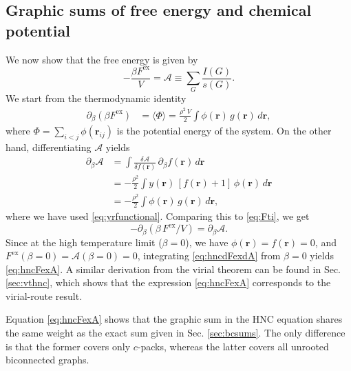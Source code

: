 \documentclass[preprint]{revtex4-1}
\newcommand{\vct}[1]{\mathbf{#1}}
\providecommand{\vr}{} %
\renewcommand{\vr}{\vct{r}}
\newcommand{\supex}[1]{ { { #1 }^{ \mathrm{ex} } } }
\newcommand{\Fex}{\supex{F}}
\newcommand{\A}{\mathcal{A}}
\begin{document}
\subsection{\label{sec:hncFex}Graphic sums of free energy and chemical potential}


We now show that the free energy is given by\cite{morita1958, *morita1959, *morita1960}
\begin{equation}
  -\frac{ \beta \Fex }{V}
=
  \A \equiv \sum_G \frac{ I(G) }{ s(G) }.
\label{eq:hncFexA}
\end{equation}
%
We start from the thermodynamic identity
\begin{align}
  \partial_\beta (\beta \Fex)
&=
 \langle \Phi \rangle
=
\frac{\rho^2 \, V}{2} \int
  \phi(\vr) \, g(\vr) \, d\vr,
  \label{eq:Fti}
\end{align}
where $\Phi = \sum_{i < j} \phi(\vr_{ij})$
is the potential energy of the system.
%
On the other hand, differentiating $\A$ yields
\begin{align*}
  \partial_\beta \A
&=
  \int
  \frac{ \delta \A } { \delta f(\vr) }
  \,
  \partial_\beta f(\vr) \, d\vr
  \\
&=
  -\frac{\rho^2} {2}
  \int
  y(\vr) \, [f(\vr) + 1]
  \, \phi(\vr) \, d\vr
  \\
&=
  -\frac{\rho^2} {2}
  \int \phi(\vr) \, g(\vr) \, d\vr,
\end{align*}
where we have used \eqref{eq:yrfunctional}.
%
Comparing this to \eqref{eq:Fti}, we get
\begin{equation}
  -\partial_\beta(\beta \, \Fex/V) = \partial_\beta \A.
  \label{eq:hncdFexdA}
\end{equation}
Since at the high temperature limit ($\beta = 0$),
we have $\phi(\vr) = f(\vr) = 0$,
and $\Fex(\beta = 0) = \A(\beta = 0) = 0$,
%
integrating \eqref{eq:hncdFexdA} from $\beta = 0$
yields \eqref{eq:hncFexA}.
%
A similar derivation from the virial theorem
can be found in Sec. \ref{sec:vthnc},
which shows that the expression \eqref{eq:hncFexA}
corresponds to the virial-route result\cite{morita1960I, *hiroike1960II, *morita1961III}.

Equation \eqref{eq:hncFexA} shows that the graphic sum
in the HNC equation shares the same weight as
the exact sum given in Sec. \ref{sec:bcsums}.
%
The only difference is that the former covers only $c$-packs,
whereas the latter covers all unrooted biconnected graphs.
\end{document}

